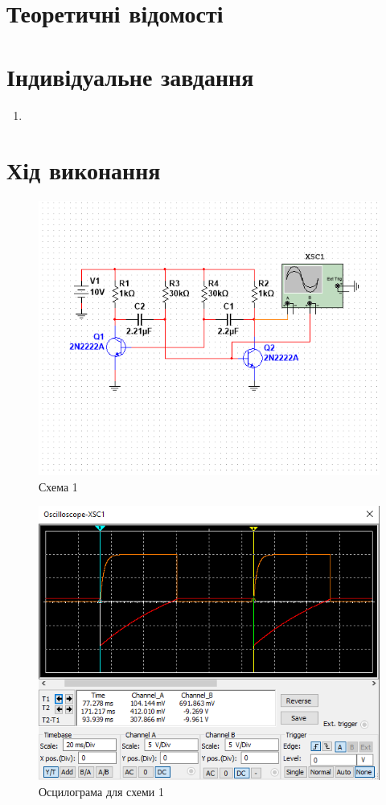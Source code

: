 \documentclass{article}
\begin{document}
\begin{normalsize}
	\section*{Теоретичні відомості}

	\section*{Індивідуальне завдання}
	\begin{enumerate}
		\item 
	\end{enumerate}

	\section*{Хід виконання}
	
	\begin{figure}[H]
		\centering
		\includegraphics[width=\textwidth]{1}
		\caption{Схема 1}
	\end{figure}

	\begin{figure}[H]
		\centering
		\includegraphics[width=\textwidth]{2}
		\caption{Осцилограма для схеми 1}
	\end{figure}


\end{normalsize}
\end{document}
